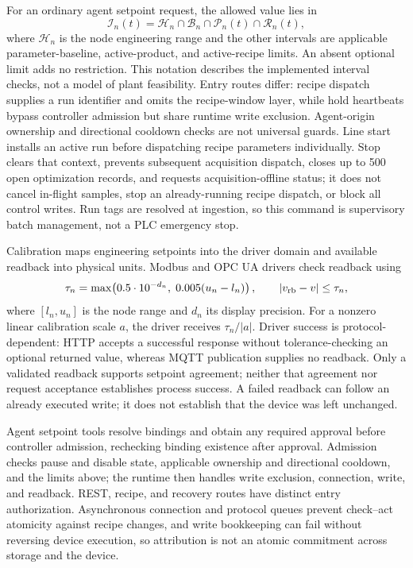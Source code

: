 For an ordinary agent setpoint request, the allowed value lies in
\begin{equation}
\mathcal{I}_n(t)=\mathcal{H}_n\cap\mathcal{B}_n
                 \cap\mathcal{P}_n(t)\cap\mathcal{R}_n(t),
\label{eq:admission}
\end{equation}
where $\mathcal{H}_n$ is the node engineering range and the other intervals
are applicable parameter-baseline, active-product, and active-recipe limits.
An absent optional limit adds no restriction. This notation describes the
implemented interval checks, not a model of plant feasibility. Entry routes differ: recipe dispatch supplies a run identifier and omits
the recipe-window layer, while hold heartbeats bypass controller admission
but share runtime write exclusion.
Agent-origin ownership and directional cooldown checks are not universal
guards. Line start installs an active run before dispatching recipe
parameters individually. Stop clears that context, prevents subsequent
acquisition dispatch, closes up to 500 open optimization records, and
requests acquisition-offline status; it does not cancel in-flight samples,
stop an already-running recipe dispatch, or block all control writes. Run
tags are resolved at ingestion, so this command is supervisory batch
management, not a PLC emergency stop.

Calibration maps engineering setpoints into the driver domain and available
readback into physical units. Modbus and OPC UA drivers check readback using
\begin{equation}
\tau_n=\max\!\left(0.5\cdot 10^{-d_n},\;0.005(u_n-l_n)\right),
\qquad |v_{\rm rb}-v|\leq\tau_n,
\label{eq:tolerance}
\end{equation}
where $[l_n,u_n]$ is the node range and $d_n$ its display precision. For a
nonzero linear calibration scale $a$, the driver receives $\tau_n/|a|$.
Driver success is protocol-dependent: HTTP accepts a successful response
without tolerance-checking an optional returned value, whereas MQTT
publication supplies no readback. Only a validated readback supports setpoint
agreement; neither that agreement nor request acceptance establishes process
success. A failed readback can follow an already executed write; it does
not establish that the device was left unchanged.

Agent setpoint tools resolve bindings and obtain any required approval before
controller admission, rechecking binding existence after approval. Admission
checks pause and disable state, applicable ownership and directional
cooldown, and the limits above; the runtime then handles write exclusion,
connection, write, and readback. REST, recipe, and recovery routes have
distinct entry authorization. Asynchronous connection and protocol queues
prevent check--act atomicity against recipe changes, and write bookkeeping
can fail without reversing device execution, so attribution is not an atomic
commitment across storage and the device.

